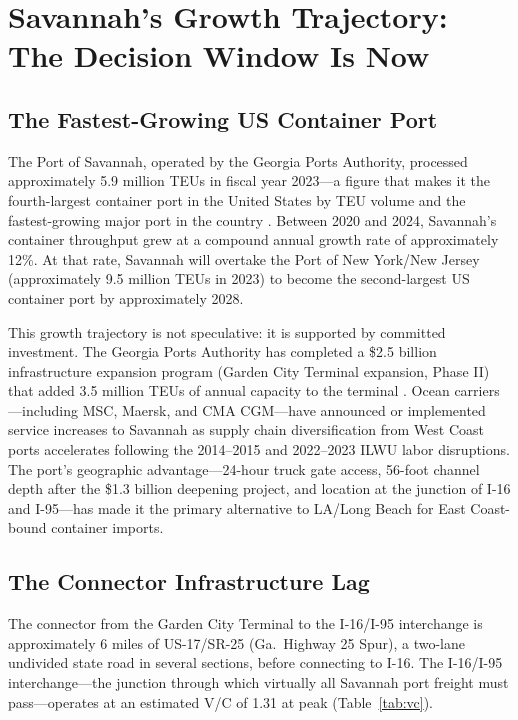 \section{Savannah's Growth Trajectory: The Decision Window Is Now}
\label{sec:savannah}

\subsection{The Fastest-Growing US Container Port}

The Port of Savannah, operated by the Georgia Ports Authority, processed approximately 5.9 million TEUs in fiscal year 2023---a figure that makes it the fourth-largest container port in the United States by TEU volume and the fastest-growing major port in the country \citep{GPA_annual2023}. Between 2020 and 2024, Savannah's container throughput grew at a compound annual growth rate of approximately 12\%. At that rate, Savannah will overtake the Port of New York/New Jersey (approximately 9.5 million TEUs in 2023) to become the second-largest US container port by approximately 2028.

This growth trajectory is not speculative: it is supported by committed investment. The Georgia Ports Authority has completed a \$2.5 billion infrastructure expansion program (Garden City Terminal expansion, Phase II) that added 3.5 million TEUs of annual capacity to the terminal \citep{GPA_annual2023}. Ocean carriers---including MSC, Maersk, and CMA CGM---have announced or implemented service increases to Savannah as supply chain diversification from West Coast ports accelerates following the 2014--2015 and 2022--2023 ILWU labor disruptions. The port's geographic advantage---24-hour truck gate access, 56-foot channel depth after the \$1.3 billion deepening project, and location at the junction of I-16 and I-95---has made it the primary alternative to LA/Long Beach for East Coast-bound container imports.

\subsection{The Connector Infrastructure Lag}

The connector from the Garden City Terminal to the I-16/I-95 interchange is approximately 6 miles of US-17/SR-25 (Ga.\ Highway 25 Spur), a two-lane undivided state road in several sections, before connecting to I-16. The I-16/I-95 interchange---the junction through which virtually all Savannah port freight must pass---operates at an estimated V/C of 1.31 at peak (Table~\ref{tab:vc}).

